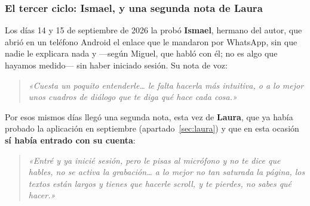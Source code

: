 \documentclass[11pt,a4paper]{article}
\begin{document}
\subsubsection{El tercer ciclo: Ismael, y una segunda nota de Laura}
\label{sec:ismael}

Los días 14 y 15 de septiembre de 2026 la probó \textbf{Ismael}, hermano del autor, que
abrió en un teléfono Android el enlace que le mandaron por WhatsApp, sin que nadie le
explicara nada y ---según Miguel, que habló con él; no es algo que hayamos medido--- sin
haber iniciado sesión. Su nota de voz:

\begin{quote}\itshape
«Cuesta un poquito entenderle\dots{} le falta hacerla más intuitiva, o a lo mejor unos
cuadros de diálogo que te diga qué hace cada cosa.»
\end{quote}

Por esos mismos días llegó una segunda nota, esta vez de \textbf{Laura}, que ya había
probado la aplicación en septiembre (apartado~\ref{sec:laura}) y que en esta ocasión
\textbf{sí había entrado con su cuenta}:

\begin{quote}\itshape
«Entré y ya inicié sesión, pero le pisas al micrófono y no te dice que hables, no se
activa la grabación\dots{} a lo mejor no tan saturada la página, los textos están largos y
tienes que hacerle scroll, y te pierdes, no sabes qué hacer.»
\end{quote}
\end{document}
